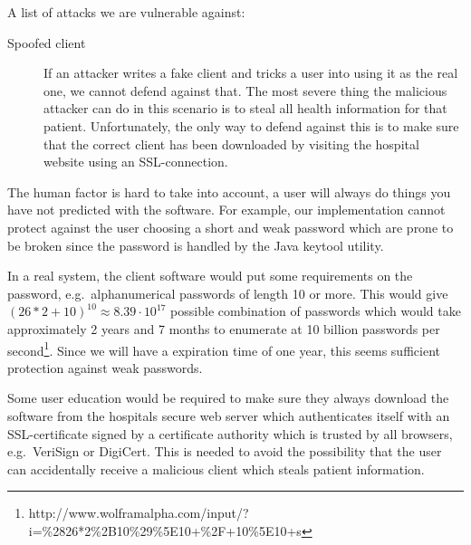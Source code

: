 \documentclass[10pt, a4paper]{article}
\begin{document}
A list of attacks we are vulnerable against:
\begin{description}
\item[Spoofed client] If an attacker writes a fake client and tricks a user into using it as the real one, we cannot defend against that. The most severe thing the malicious attacker can do in this scenario is to steal all health information for that patient. Unfortunately, the only way to defend against this is to make sure that the correct client has been downloaded by visiting the hospital website using an SSL-connection.
\item[]
\end{description}

The human factor is hard to take into account, a user will always do things you have not predicted with the software. For example, our implementation cannot protect against the user choosing a short and weak password which are prone to be broken since the password is handled by the Java keytool utility.

In a real system, the client software would put some requirements on the password, e.g.~alphanumerical passwords of length 10 or more. This would give $(26*2 + 10)^{10} \approx 8.39\cdot 10^{17}$ possible combination of passwords which would take approximately 2 years and 7 months to enumerate at 10 billion passwords per second\footnote{http://www.wolframalpha.com/input/?i=\%2826*2\%2B10\%29\%5E10+\%2F+10\%5E10+s}. Since we will have a expiration time of one year, this seems sufficient protection against weak passwords.

Some user education would be required to make sure they always download the software from the hospitals secure web server which authenticates itself with an SSL-certificate signed by a certificate authority which is trusted by all browsers, e.g.~VeriSign or DigiCert. This is needed to avoid the possibility that the user can accidentally receive a malicious client which steals patient information.
\end{document}
